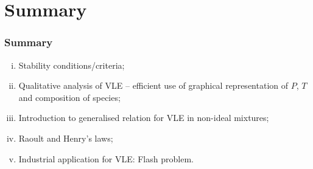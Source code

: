 \documentclass[10pt,compress,handout,ignorenonframetext,unknownkeysallowed]{beamer}
\begin{document}
\section{Summary}

\begin{frame}
 \frametitle{Summary}
   \begin{enumerate}[(i)]
     \item Stability conditions/criteria;
     \item Qualitative analysis of VLE -- efficient use of graphical representation of $P$, $T$ and composition of species;
     \item Introduction to generalised relation for VLE in non-ideal mixtures;
     \item Raoult and Henry's laws; 
     \item Industrial application for VLE: Flash problem.
   \end{enumerate}
\end{frame}
\end{document}
